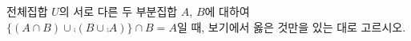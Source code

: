 전체집합 $U$의 서로 다른 두 부분집합 $A$, $B$에 대하여 $\{(A\cap B)\cup\comp{(B\cup\comp{A})}\}\cap B=A$일 때, 보기에서 옳은 것만을 있는 대로 고르시오. 
